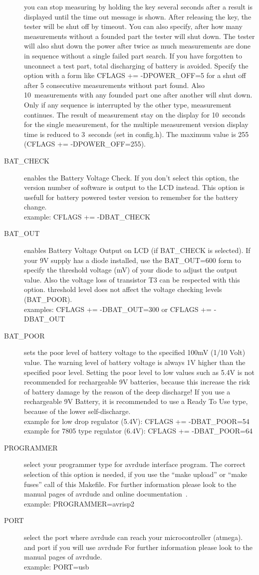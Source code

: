 \begin{description}
you can stop measuring by holding the key several seconds after a result is displayed until the time out message is shown.
After releasing the key, the tester will be shut off by timeout.
You can also specify, after how many measurements without a founded part the tester will shut down.
The tester will also shut down the power after twice as much measurements are done in sequence without a
single failed part search. If you have forgotten to unconnect a test part, total discharging of battery is avoided. 
Specify the option with a form like CFLAGS += -DPOWER\_OFF=5 for a shut off after 5 consecutive measurements
without part found. Also 10~measurements with any founded part one after another will shut down.
Only if any sequence is interrupted by the other type, measurement continues.
The result of measurement stay on the display for 10~seconds for the single measurement, for the
multiple measurement version display time is reduced to 3~seconds (set in config.h).
The maximum value is 255 (CFLAGS += -DPOWER\_OFF=255).
  \item[BAT\_CHECK] enables the Battery Voltage Check. If you don't select this option, the version number of
software is output to the LCD instead.
This option is usefull for battery powered tester version to remember for the battery change.\\
example: CFLAGS += -DBAT\_CHECK
  \item[BAT\_OUT] enables Battery Voltage Output on LCD (if BAT\_CHECK is selected).
 If your 9V supply has a diode installed, use the BAT\_OUT=600 form to specify the threshold voltage (mV) of your diode
to adjust the output value.
Also the voltage loss of transistor T3 can be respected with this option.
 threshold level does not affect the voltage checking levels (BAT\_POOR).\\
examples: CFLAGS += -DBAT\_OUT=300  or CFLAGS += -DBAT\_OUT
  \item[BAT\_POOR] sets the poor level of battery voltage to the specified 100mV (1/10 Volt) value.
The warning level of battery voltage is always 1V higher than the specified poor level.
Setting the poor level to low values such as 5.4V is not recommended for rechargeable 9V batteries,
because this increase the risk of battery damage by the reason of the deep discharge!
If you use a rechargeable 9V Battery, it is recommended to use a Ready To Use type, because of the lower self-discharge.\\
example for low drop regulator (5.4V): CFLAGS += -DBAT\_POOR=54
example for 7805 type regulator (6.4V): CFLAGS += -DBAT\_POOR=64
  \item[PROGRAMMER] select your programmer type for avrdude interface program.
The correct selection of this option is needed, if you use the ``make upload'' or ``make fuses'' call
of this Makefile.
For further information please look to the manual pages of avrdude and online documentation~\cite{avrdude}.\\
example: PROGRAMMER=avrisp2
  \item[PORT] select the port where avrdude can reach your microcontroller (atmega).
and port if you will use avrdude
For further information please look to the manual pages of avrdude.\\
example: PORT=usb


\end{description}
